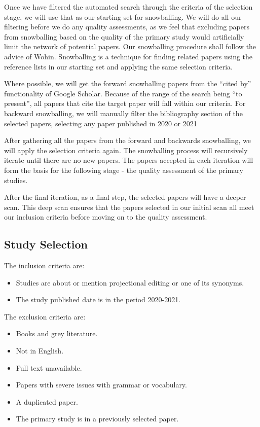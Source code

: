 Once we have filtered the automated search through the criteria of the selection stage, we will use that as our starting set for snowballing.
We will do all our filtering before we do any quality assessments, as we feel that excluding papers from snowballing based on the quality of the primary study would artificially limit the network of potential papers.
Our snowballing procedure shall follow the advice of Wohin\cite{Wohlin_2014}.
Snowballing is a technique for finding related papers using the reference lists in our starting set and applying the same selection criteria.

Where possible, we will get the forward snowballing papers from the ``cited by'' functionality of Google Scholar.
Because of the range of the search being ``to present'', all papers that cite the target paper will fall within our criteria.
For backward snowballing, we will manually filter the bibliography section of the selected papers, selecting any paper published in 2020 or 2021

After gathering all the papers from the forward and backwards snowballing, we will apply the selection criteria again.
The snowballing process will recursively iterate until there are no new papers.
The papers accepted in each iteration will form the basis for the following stage - the quality assessment of the primary studies.

After the final iteration, as a final step, the selected papers will have a deeper scan. 
This deep scan ensures that the papers selected in our initial scan all meet our inclusion criteria before moving on to the quality assessment.

\subsection{Study Selection}

The inclusion criteria are:
\begin{itemize}
    \setlength\itemsep{0em}
    \item Studies are about or mention projectional editing or one of its synonyms.
    \item The study published date is in the period 2020-2021.
\end{itemize}

\noindent
The exclusion criteria are:
\begin{itemize}
    \setlength\itemsep{0em}
    \item Books and grey literature.
    \item Not in English.
    \item Full text unavailable.
    \item Papers with severe issues with grammar or vocabulary.
    \item A duplicated paper.
    \item The primary study is in a previously selected paper.
\end{itemize}

